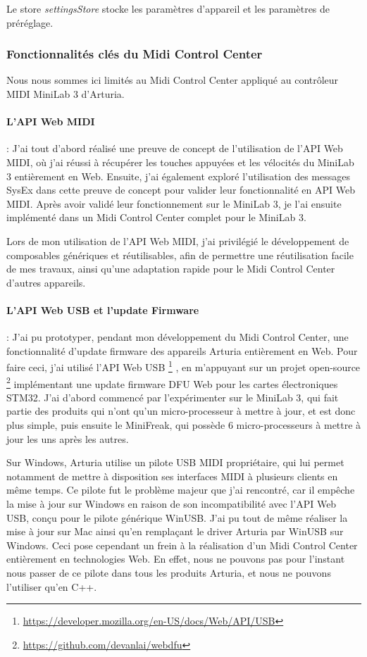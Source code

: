 \documentclass[francais]{rapportPFE}  %
\begin{document}
Le store \textit{settingsStore} stocke les paramètres d'appareil et les paramètres de préréglage.



\subsubsection{Fonctionnalités clés du Midi Control Center}

Nous nous sommes ici limités au Midi Control Center appliqué au contrôleur MIDI MiniLab 3 d'Arturia.

\paragraph{L'API Web MIDI}:
J'ai tout d'abord réalisé une preuve de concept de l'utilisation de l'API Web MIDI, où j'ai réussi à récupérer les touches appuyées et les vélocités du MiniLab 3 entièrement en Web. Ensuite, j'ai également exploré l'utilisation des messages SysEx dans cette preuve de concept pour valider leur fonctionnalité en API Web MIDI.
Après avoir validé leur fonctionnement sur le MiniLab 3, je l'ai ensuite implémenté dans un Midi Control Center complet pour le MiniLab 3. 

Lors de mon utilisation de l'API Web MIDI, j'ai privilégié le développement de composables génériques et réutilisables, afin de permettre une réutilisation facile de mes travaux, ainsi qu'une adaptation rapide pour le Midi Control Center d'autres appareils.


\paragraph{L'API Web USB et l'update Firmware}:
J'ai pu prototyper, pendant mon développement du Midi Control Center, une fonctionnalité d'update firmware des appareils Arturia entièrement en Web. Pour faire ceci, j'ai utilisé l'API Web USB
\footnote{\url{https://developer.mozilla.org/en-US/docs/Web/API/USB}} 
, en m'appuyant sur un projet open-source 
\footnote{\url{https://github.com/devanlai/webdfu}}
implémentant une update firmware DFU Web pour les cartes électroniques STM32.
J'ai d'abord commencé par l'expérimenter sur le MiniLab 3, qui fait partie des produits qui n'ont qu'un micro-processeur à mettre à jour, et est donc plus simple, puis ensuite le MiniFreak, qui possède 6 micro-processeurs à mettre à jour les uns après les autres.

Sur Windows, Arturia utilise un pilote USB MIDI propriétaire, qui lui permet notamment de mettre à disposition ses interfaces MIDI à plusieurs clients en même temps. Ce pilote fut le problème majeur que j'ai rencontré, car il empêche la mise à jour sur Windows en raison de son incompatibilité avec l'API Web USB, conçu pour le pilote générique WinUSB. J'ai pu tout de même réaliser la mise à jour sur Mac ainsi qu'en remplaçant le driver Arturia par WinUSB sur Windows. Ceci pose cependant un frein à la réalisation d'un Midi Control Center entièrement en technologies Web. En effet, nous ne pouvons pas pour l'instant nous passer de ce pilote dans tous les produits Arturia, et nous ne pouvons l'utiliser qu'en C++.
\end{document}
